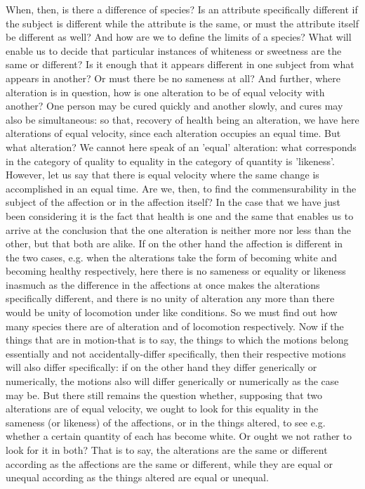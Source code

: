 When, then, is there a difference of species? Is an attribute specifically
different if the subject is different while the attribute is the same,
or must the attribute itself be different as well? And how are we
to define the limits of a species? What will enable us to decide that
particular instances of whiteness or sweetness are the same or different?
Is it enough that it appears different in one subject from what appears
in another? Or must there be no sameness at all? And further, where
alteration is in question, how is one alteration to be of equal velocity
with another? One person may be cured quickly and another slowly,
and cures may also be simultaneous: so that, recovery of health being
an alteration, we have here alterations of equal velocity, since each
alteration occupies an equal time. But what alteration? We cannot
here speak of an 'equal' alteration: what corresponds in the category
of quality to equality in the category of quantity is 'likeness'.
However, let us say that there is equal velocity where the same change
is accomplished in an equal time. Are we, then, to find the commensurability
in the subject of the affection or in the affection itself? In the
case that we have just been considering it is the fact that health
is one and the same that enables us to arrive at the conclusion that
the one alteration is neither more nor less than the other, but that
both are alike. If on the other hand the affection is different in
the two cases, e.g. when the alterations take the form of becoming
white and becoming healthy respectively, here there is no sameness
or equality or likeness inasmuch as the difference in the affections
at once makes the alterations specifically different, and there is
no unity of alteration any more than there would be unity of locomotion
under like conditions. So we must find out how many species there
are of alteration and of locomotion respectively. Now if the things
that are in motion-that is to say, the things to which the motions
belong essentially and not accidentally-differ specifically, then
their respective motions will also differ specifically: if on the
other hand they differ generically or numerically, the motions also
will differ generically or numerically as the case may be. But there
still remains the question whether, supposing that two alterations
are of equal velocity, we ought to look for this equality in the sameness
(or likeness) of the affections, or in the things altered, to see
e.g. whether a certain quantity of each has become white. Or ought
we not rather to look for it in both? That is to say, the alterations
are the same or different according as the affections are the same
or different, while they are equal or unequal according as the things
altered are equal or unequal. 

